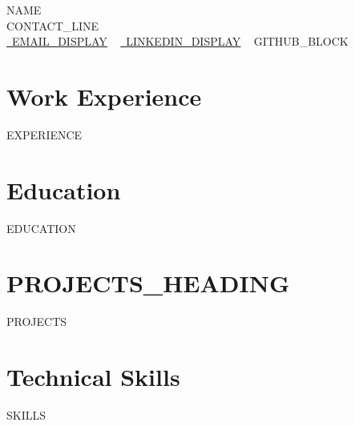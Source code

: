 \documentclass[letterpaper,11pt]{article}
\newcommand{\resumeSubHeadingListStart}{\begin{itemize}[leftmargin=0.0in, label={}]}
\newcommand{\resumeSubHeadingListEnd}{\end{itemize}}
\begin{document}
    \begin{center}
        {\Huge\scshape {{NAME}}}
        \\ {{CONTACT_LINE}}\\
        \small
        \href{mailto:{{EMAIL_URL}}}{\raisebox{-0.2\height}\faEnvelope\  \underline{{{EMAIL_DISPLAY}}}} ~
        \href{{{LINKEDIN_URL}}}{\raisebox{-0.2\height}\faLinkedin\ \underline{{{LINKEDIN_DISPLAY}}}}  ~
{{GITHUB_BLOCK}}
    \end{center}

\section{Work Experience}
  \resumeSubHeadingListStart
{{EXPERIENCE}}
  \resumeSubHeadingListEnd

\section{Education}
  \resumeSubHeadingListStart
{{EDUCATION}}
  \resumeSubHeadingListEnd

\section{{{PROJECTS_HEADING}}}
\resumeSubHeadingListStart
{{PROJECTS}}
\resumeSubHeadingListEnd

\section{Technical Skills}
\vspace{-7pt}
\begin{itemize}
[leftmargin=0.15in, label={}]\small{\item{
{{SKILLS}}
}}
\end{itemize}
\end{document}
